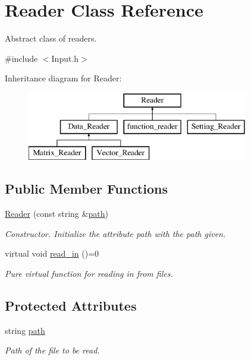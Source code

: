 \hypertarget{class_reader}{}\section{Reader Class Reference}
\label{class_reader}


Abstract class of readers.  




{\ttfamily \#include $<$Input.\+h$>$}

Inheritance diagram for Reader\+:\begin{figure}[H]
\begin{center}
\leavevmode
\includegraphics[height=3.000000cm]{class_reader}
\end{center}
\end{figure}
\subsection*{Public Member Functions}
\begin{DoxyCompactItemize}
\item 
\mbox{\label{class_reader_a14282e3b34a1a2c8a8b2448a76edbf64}} 
\mbox{\hyperlink{class_reader_a14282e3b34a1a2c8a8b2448a76edbf64}{Reader}} (const string \&\mbox{\hyperlink{class_reader_a4f3eaccb117f248d4649ffb4e793a23d}{path}})
\begin{DoxyCompactList}\small\item\em Constructor. Initialize the attribute path with the path given. \end{DoxyCompactList}\item 
\mbox{\label{class_reader_ae95b8c18df56f806ca619f3d06326d63}} 
virtual void \mbox{\hyperlink{class_reader_ae95b8c18df56f806ca619f3d06326d63}{read\+\_\+in}} ()=0
\begin{DoxyCompactList}\small\item\em Pure virtual function for reading in from files. \end{DoxyCompactList}\end{DoxyCompactItemize}
\subsection*{Protected Attributes}
\begin{DoxyCompactItemize}
\item 
\mbox{\label{class_reader_a4f3eaccb117f248d4649ffb4e793a23d}} 
string \mbox{\hyperlink{class_reader_a4f3eaccb117f248d4649ffb4e793a23d}{path}}
\begin{DoxyCompactList}\small\item\em Path of the file to be read. \end{DoxyCompactList}\end{DoxyCompactItemize}


